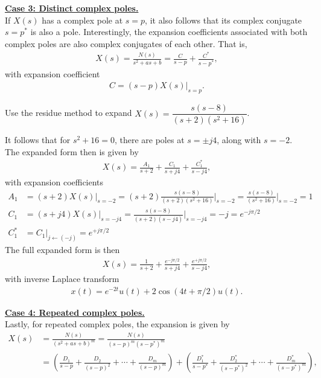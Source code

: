 \documentclass{report}
\begin{document}
\textbf{\underline{Case 3: Distinct complex poles.}} \\[0.25cm]
If $X(s)$ has a complex pole at $s=p$, it also follows that its complex conjugate $s=p^*$ is also a pole. Interestingly, the expansion coefficients associated with 
both complex poles are also complex conjugates of each other. That is, 
\begin{align}
    X(s) = \frac{N(s)}{s^2+as+b} = \frac{C}{s-p} + \frac{C^*}{s-p^*},
\end{align}
with expansion coefficient 
\begin{align}
    C = (s-p)X(s)\big|_{s=p}.
\end{align}
\begin{example}
    Use the residue method to expand $X(s)=\dfrac{s(s-8)}{(s+2)(s^2+16)}$. \\
\end{example}
\begin{solution}
    It follows that for $s^2+16=0$, there are poles at $s=\pm j4$, along with $s=-2$. The expanded form then is given by 
    \begin{align*}
        X(s) = \frac{A_1}{s+2} + \frac{C_1}{s+j4} + \frac{C_1^*}{s-j4},
    \end{align*}
    with expansion coefficients
    \begin{align*}
        A_1 &= (s+2)X(s)\big|_{s=-2} = (s+2)\frac{s(s-8)}{(s+2)(s^2+16)}\bigg|_{s=-2} = \frac{s(s-8)}{(s^2+16)}\bigg|_{s=-2} = 1 \\[0.5cm]
        C_1 &= (s+j4)X(s)\big|_{s=-j4} = \frac{s(s-8)}{(s+2)(s-j4)}\bigg|_{s=-j4} = -j = e^{-j\pi/2} \\[0.5cm]
        C_1^* &= C_1\big|_{j\leftarrow(-j)} = e^{+j\pi/2}
    \end{align*}
    The full expanded form is then 
    \begin{align*}
        X(s) = \frac{1}{s+2} + \frac{e^{-j\pi/2}}{s+j4} + \frac{e^{+j\pi/2}}{s-j4},
    \end{align*}
    with inverse Laplace transform 
    \begin{align*}
        x(t) = e^{-2t}u(t) + 2\cos(4t+\pi/2)u(t).
    \end{align*}
\end{solution}
\textbf{\underline{Case 4: Repeated complex poles.}} \\[0.25cm]
Lastly, for repeated complex poles, the expansion is given by 
\begin{align}
    X(s) &= \frac{N(s)}{(s^2+as+b)^m} = \frac{N(s)}{(s-p)^m(s-p^*)^m} \nonumber \\
    &= \left(\frac{D_1}{s-p} + \frac{D_2}{(s-p)^2} + \cdots + \frac{D_m}{(s-p)^m}\right) + \left(\frac{D_1^*}{s-p^*} + \frac{D_2^*}{(s-p^*)^2} + \cdots + \frac{D_m^*}{(s-p^*)^m}\right),
\end{align}
\end{document}
